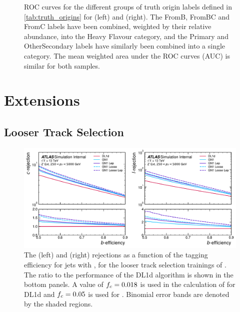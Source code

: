 \begin{figure}[!htbp]
\begin{subfigure}[b]{0.48\textwidth}
    \end{subfigure}
    \caption{ROC curves for the different groups of truth origin labels defined in \cref{tab:truth_origins} for \ttbarjets (left) and \Zprimejets (right).
             The FromB, FromBC and FromC labels have been combined, weighted by their relative abundance, into the Heavy Flavour category, and the Primary and OtherSecondary labels have similarly been combined into a single category.
             The mean weighted area under the ROC curves (AUC) is similar for both samples.}
    \label{fig:track_origin_roc}
\end{figure}




\section{Extensions}
\subsection{Looser Track Selection}\label{sec:looser_track_selection}


\begin{figure}[!htbp]
    \centering
    \includegraphics[width=\textwidth]{chapters/gnn_tagger/figs/gn1_loose_zprime.pdf}
    \caption{
        The \cjet (left) and \ljet (right) rejections as a function of the \bjet tagging efficiency for \Zprime jets with \Zprimept, for the looser track selection trainings of \GNN.
        The ratio to the performance of the DL1d algorithm is shown in the bottom panels.
        A value of $f_c = 0.018$ is used in the calculation of \Db for DL1d and $f_c = 0.05$ is used for \GNN.
        Binomial error bands are denoted by the shaded regions.
    }
    \label{fig:zprime_gn1_loose}
\end{figure}




